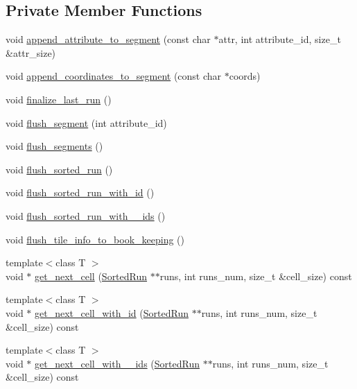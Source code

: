 \subsection*{Private Member Functions}
\begin{DoxyCompactItemize}
\item 
void \hyperlink{classWriteState_aaa474b502429385061fd7f39ada13ec2}{append\+\_\+attribute\+\_\+to\+\_\+segment} (const char $\ast$attr, int attribute\+\_\+id, size\+\_\+t \&attr\+\_\+size)
\item 
void \hyperlink{classWriteState_ac7589d2b22027b75069cea30ec3e748d}{append\+\_\+coordinates\+\_\+to\+\_\+segment} (const char $\ast$coords)
\item 
void \hyperlink{classWriteState_a6aef6a9167f710a034e9f18b55b64a4a}{finalize\+\_\+last\+\_\+run} ()
\item 
void \hyperlink{classWriteState_a168c79e766b0f97d60941a2508f99d9d}{flush\+\_\+segment} (int attribute\+\_\+id)
\item 
void \hyperlink{classWriteState_a201d10d80ef4d5d927563162a1cd48da}{flush\+\_\+segments} ()
\item 
void \hyperlink{classWriteState_a7768df8e04de32e3814fc0a744aae319}{flush\+\_\+sorted\+\_\+run} ()
\item 
void \hyperlink{classWriteState_a7ed555ccf4714a2472925e939d24b2e2}{flush\+\_\+sorted\+\_\+run\+\_\+with\+\_\+id} ()
\item 
void \hyperlink{classWriteState_a5acba4f3d1a3f9c303e17152279a3536}{flush\+\_\+sorted\+\_\+run\+\_\+with\+\_\+\_\+ids} ()
\item 
void \hyperlink{classWriteState_a64c2e76a65d3e5ea9eac431d4058222c}{flush\+\_\+tile\+\_\+info\+\_\+to\+\_\+book\+\_\+keeping} ()
\item 
{\footnotesize template$<$class T $>$ }\\void $\ast$ \hyperlink{classWriteState_aceb2bce76ee0c399018d4e90828d69b4}{get\+\_\+next\+\_\+cell} (\hyperlink{classSortedRun}{Sorted\+Run} $\ast$$\ast$runs, int runs\+\_\+num, size\+\_\+t \&cell\+\_\+size) const 
\item 
{\footnotesize template$<$class T $>$ }\\void $\ast$ \hyperlink{classWriteState_a2486f1e8a4e8854cf75231b753602e4f}{get\+\_\+next\+\_\+cell\+\_\+with\+\_\+id} (\hyperlink{classSortedRun}{Sorted\+Run} $\ast$$\ast$runs, int runs\+\_\+num, size\+\_\+t \&cell\+\_\+size) const 
\item 
{\footnotesize template$<$class T $>$ }\\void $\ast$ \hyperlink{classWriteState_a23265214a3d37c668f1b7b85391ec51d}{get\+\_\+next\+\_\+cell\+\_\+with\+\_\+\_\+ids} (\hyperlink{classSortedRun}{Sorted\+Run} $\ast$$\ast$runs, int runs\+\_\+num, size\+\_\+t \&cell\+\_\+size) const 
$$
\end{DoxyCompactItemize}

